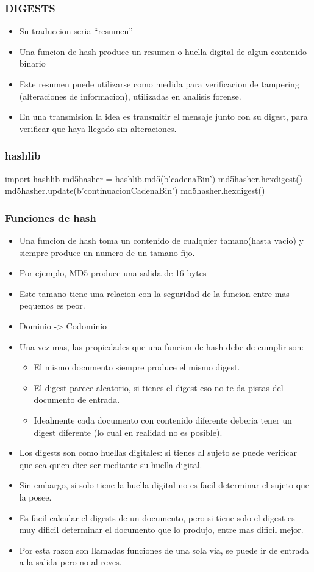 \documentclass[11pt]{article}
\begin{document}
\subsubsection{DIGESTS}
\label{sec:orgc8bb8c6}
\begin{itemize}
\item Su traduccion seria ``resumen''
\item Una funcion de hash produce un resumen o huella digital de algun contenido binario
\item Este resumen puede utilizarse como medida para verificacion de tampering (alteraciones de informacion), utilizadas en analisis forense.
\item En una transmision la idea es transmitir el mensaje junto con su digest, para verificar que haya llegado sin alteraciones.
\end{itemize}
\subsubsection{hashlib}
\label{sec:orgd9b5f10}
import hashlib
md5hasher = hashlib.md5(b'cadenaBin')
md5hasher.hexdigest()
md5hasher.update(b'continuacionCadenaBin')
md5hasher.hexdigest()
\subsubsection{Funciones de hash}
\label{sec:org088ba06}
\begin{itemize}
\item Una funcion de hash toma un contenido de cualquier tamano(hasta vacio) y siempre produce un numero de un tamano fijo.
\item Por ejemplo, MD5 produce una salida de 16 bytes
\item Este tamano tiene una relacion con la seguridad de la funcion entre mas pequenos es peor.
\item Dominio -> Codominio
\item Una vez mas, las propiedades que una funcion de hash debe de cumplir son:
\begin{itemize}
\item El mismo documento siempre produce el mismo digest.
\item El digest parece aleatorio, si tienes el digest eso no te da pistas del documento de entrada.
\item Idealmente cada documento con contenido diferente deberia tener un digest diferente (lo cual en realidad no es posible).
\end{itemize}

\item Los digests son como huellas digitales: si tienes al sujeto se puede verificar que sea quien dice ser mediante su huella digital.
\item Sin embargo, si solo tiene la huella digital no es facil determinar el sujeto que la posee.
\item Es facil calcular el digests de un documento, pero si tiene solo el digest es muy dificil determinar el documento que lo produjo, entre mas dificil mejor.
\item Por esta razon son llamadas funciones de una sola via, se puede ir de entrada a la salida pero no al reves.
\end{itemize}
\end{document}
